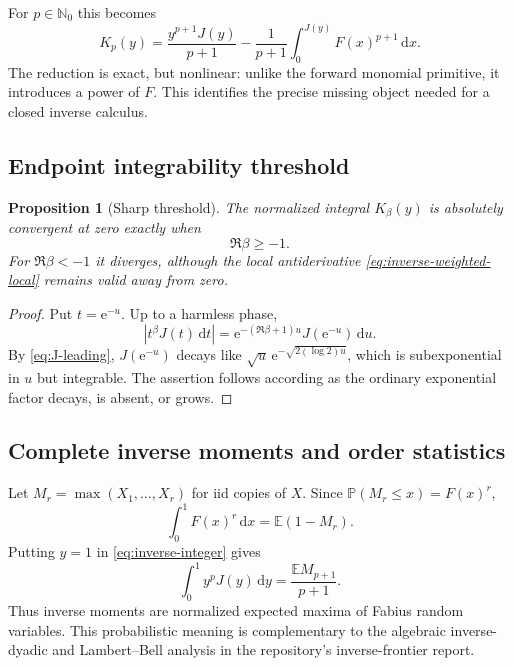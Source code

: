 \documentclass[11pt,oneside]{article}
\numberwithin{equation}{section}
\newtheorem{proposition}[theorem]{Proposition}
\theoremstyle{definition}
\theoremstyle{remark}
\newcommand{\N}{\mathbb N}
\newcommand{\E}{\mathbb E}
\newcommand{\Prob}{\mathbb P}
\newcommand{\InvF}{J}
\newcommand{\e}{\mathrm e}
\newcommand{\dd}{\,\mathrm d}
\newcommand{\abs}[1]{\left|#1\right|}
\begin{document}
For $p\in\N_0$ this becomes
\begin{equation}
 K_p(y)=\frac{y^{p+1}\InvF(y)}{p+1}
 -\frac1{p+1}\int_0^{\InvF(y)}F(x)^{p+1}\dd x.            \label{eq:inverse-integer}
\end{equation}
The reduction is exact, but nonlinear: unlike the forward monomial primitive,
it introduces a power of $F$.  This identifies the precise missing object
needed for a closed inverse calculus.

\subsection{Endpoint integrability threshold}
\begin{proposition}[Sharp threshold]
\label{prop:inverse-threshold}
The normalized integral $K_\beta(y)$ is absolutely convergent at zero exactly
when
\begin{equation}
 \Re\beta\ge-1.                                            \label{eq:inverse-threshold}
\end{equation}
For $\Re\beta<-1$ it diverges, although the local antiderivative
\eqref{eq:inverse-weighted-local} remains valid away from zero.
\end{proposition}

\begin{proof}
Put $t=\e^{-u}$.  Up to a harmless phase,
\[
 \abs{t^\beta\InvF(t)\dd t}
 =\e^{-(\Re\beta+1)u}\InvF(\e^{-u})\dd u.
\]
By \eqref{eq:J-leading}, $\InvF(\e^{-u})$ decays like
$\sqrt u\,\e^{-\sqrt{2(\log2)u}}$, which is subexponential in $u$ but
integrable.  The assertion follows according as the ordinary exponential
factor decays, is absent, or grows.
\end{proof}

\subsection{Complete inverse moments and order statistics}
Let $M_r=\max(X_1,\ldots,X_r)$ for iid copies of $X$.  Since
$\Prob(M_r\le x)=F(x)^r$,
\begin{equation}
 \int_0^1F(x)^r\dd x=\E(1-M_r).                            \label{eq:max-complement}
\end{equation}
Putting $y=1$ in \eqref{eq:inverse-integer} gives
\begin{equation}
 \boxed{
 \int_0^1y^p\InvF(y)\dd y
 =\frac{\E M_{p+1}}{p+1}.}                                \label{eq:inverse-order-stat}
\end{equation}
Thus inverse moments are normalized expected maxima of Fabius random variables.
This probabilistic meaning is complementary to the algebraic inverse-dyadic
and Lambert--Bell analysis in the repository's inverse-frontier report.
\end{document}
